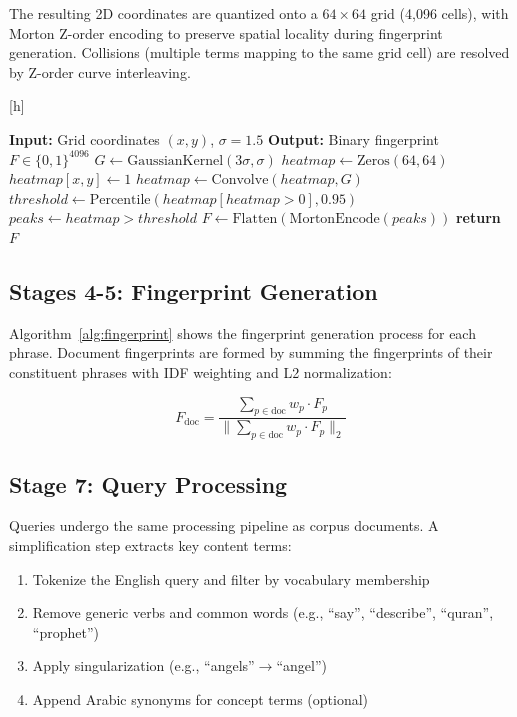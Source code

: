 \documentclass[conference]{IEEEtran}
\makeatletter
\newcounter{algorithm}
\newenvironment{algorithm}[1][h]
  {\@float{algorithm}[#1]\footnotesize}
  {\end@float}
\makeatother
\begin{document}
The resulting 2D coordinates are quantized onto a $64 \times 64$ grid
(4,096 cells), with Morton Z-order encoding to preserve spatial
locality during fingerprint generation. Collisions (multiple terms
mapping to the same grid cell) are resolved by Z-order curve
interleaving.

\begin{algorithm}[h]
  \caption{Fingerprint generation for a single phrase.}
  \label{alg:fingerprint}
  \footnotesize
  \begin{algorithmic}[1]
    \State \textbf{Input:} Grid coordinates $(x, y)$, $\sigma=1.5$
    \State \textbf{Output:} Binary fingerprint $F \in \{0,1\}^{4096}$
    \State \quad
    \State $G \gets \text{GaussianKernel}(3\sigma, \sigma)$
    \State $heatmap \gets \text{Zeros}(64, 64)$
    \State $heatmap[x, y] \gets 1$
    \State $heatmap \gets \text{Convolve}(heatmap, G)$
    \State $threshold \gets \text{Percentile}(heatmap[heatmap>0], 0.95)$
    \State $peaks \gets heatmap > threshold$
    \State $F \gets \text{Flatten}(\text{MortonEncode}(peaks))$
    \State \textbf{return} $F$
  \end{algorithmic}
\end{algorithm}

\subsection{Stages 4-5: Fingerprint Generation}

Algorithm~\ref{alg:fingerprint} shows the fingerprint generation process
for each phrase. Document fingerprints are formed by summing the
fingerprints of their constituent phrases with IDF weighting and L2
normalization:

\begin{equation}
  F_{\text{doc}} =
  \frac{\sum_{p \in \text{doc}} w_p \cdot F_p}
       {\|\sum_{p \in \text{doc}} w_p \cdot F_p\|_2}
\end{equation}

\subsection{Stage 7: Query Processing}

Queries undergo the same processing pipeline as corpus documents. A
simplification step extracts key content terms:

\begin{enumerate}
  \item Tokenize the English query and filter by vocabulary membership
  \item Remove generic verbs and common words (e.g., ``say'',
        ``describe'', ``quran'', ``prophet'')
  \item Apply singularization (e.g., ``angels''$\rightarrow$``angel'')
  \item Append Arabic synonyms for concept terms (optional)
\end{enumerate}
\end{document}

